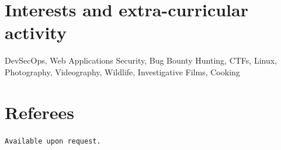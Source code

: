 \documentclass[11pt,a4paper]{moderncv}
\begin{document}
\section{Interests and extra-curricular activity}
\begin{large}
	DevSecOps, Web Applications Security, Bug Bounty Hunting, CTFs, Linux, Photography, Videography, Wildlife, Investigative Films, Cooking
\end{large}

 
	
	
	
	


\section{Referees}
\texttt{Available upon request.}

	



\end{document}
